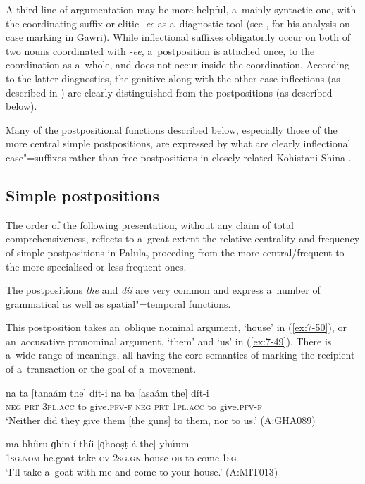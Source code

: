 A third line of argumentation may be more helpful, a~mainly syntactic one, with the coordinating suffix or clitic \textit{-ee} as a~diagnostic tool (see \citealt[77]{baart1999a}, for his analysis on case marking in Gawri). While inflectional suffixes obligatorily occur on both of two nouns coordinated with \textit{-ee}, a~postposition is attached once, to the coordination as a~whole, and does not occur inside the coordination. According to the latter diagnostics, the genitive along with the other case inflections (as described in ) are clearly distinguished from the postpositions (as described below). 


Many of the postpositional functions described below, especially those of the more central simple postpositions, are expressed by what are clearly inflectional case"=suffixes rather than free postpositions in closely related Kohistani Shina \citep[115--130]{schmidtkohistani2001}. 


\subsection{Simple postpositions}
\label{subsec:7-2-2}

The order of the following presentation, without any claim of total comprehensiveness, reflects to a~great extent the relative centrality and frequency of simple postpositions in Palula, proceding from the more central/frequent to the more specialised or less frequent ones. 


The postpositions \textit{the} and \textit{díi} are very common and express a~number of grammatical as well as spatial"=temporal functions. 


 This postposition takes an~oblique nominal argument, `house' in (\ref{ex:7-50}), or an~accusative pronominal argument, `them' and `us' in (\ref{ex:7-49}). There is a~wide range of meanings, all having the core semantics of marking the recipient of a~transaction or the goal of a~movement. 
\begin{exe}
\ex
\label{ex:7-49}
\gll na ta [tanaám the] dít-i na ba  [asaám the] dít-i \\
\textsc{neg} \textsc{prt} \textsc{3pl.acc} to give.\textsc{pfv-f} \textsc{neg} \textsc{prt} \textsc{1pl.acc} to give.\textsc{pfv-f} \\
\glt `Neither did they give them [the guns] to them, nor to us.' (A:GHA089)
\end{exe}
\begin{exe}
\ex
\label{ex:7-50}
\gll ma bhíiru ɡhin-í thíi [ɡhooṣṭ-á the] yhúum \\
\textsc{1sg.nom} he.goat take-\textsc{cv} \textsc{2sg.gn} house-\textsc{ob} to come.\textsc{1sg} \\
\glt `I'll take a~goat with me and come to your house.' (A:MIT013)
\end{exe}

